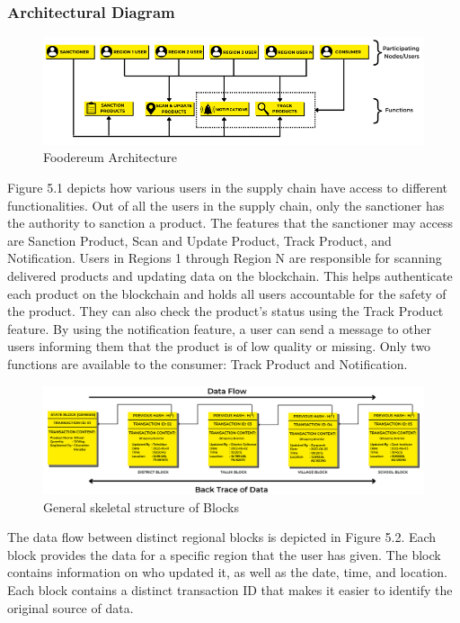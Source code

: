 \documentclass[12pt,a4paper,twocolumn,fleqn]{article}
\begin{document}
\subsubsection{Architectural Diagram}
\begin{figure} [H]
\includegraphics[width=17cm]{media/Foodereum_Arc.png}
\centering
\caption{Foodereum Architecture}
\end{figure} 
Figure 5.1 depicts how various users in the supply chain have access to different functionalities. Out of all the users in the supply chain, only the sanctioner has the authority to sanction a product. The features that the sanctioner may access are Sanction Product, Scan and Update Product, Track Product, and Notification. Users in Regions 1 through Region N are responsible for scanning delivered products and updating data on the blockchain. This helps authenticate each product on the blockchain and holds all users accountable for the safety of the product. They can also check the product's status using the Track Product feature. By using the notification feature, a user can send a message to other users informing them that the product is of low quality or missing. Only two functions are available to the consumer: Track Product and Notification.
\begin{figure} [H]
\includegraphics[width=17cm]{media/Blocks.png}
\centering
\caption{General skeletal structure of Blocks}
\end{figure}
The data flow between distinct regional blocks is depicted in Figure 5.2. Each block provides the data for a specific region that the user has given. The block contains information on who updated it, as well as the date, time, and location. Each block contains a distinct transaction ID that makes it easier to identify the original source of data.
\newpage
  \pagestyle{fancy}
  \fancyhf{}
  \chead{}
  \renewcommand{\headrulewidth}{0.4pt}%
\renewcommand{\footrulewidth}{0.4pt}%
\normalsize
\end{document}
